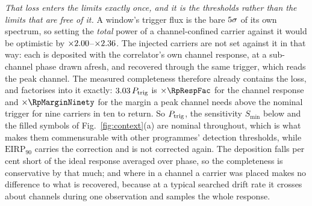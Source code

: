\emph{That loss enters the limits exactly once, and it is the thresholds
rather than the limits that are free of it.} A window's trigger flux is the
bare $5\sigma$ of its own spectrum, so setting the \emph{total}
power of a channel-confined carrier against it would be optimistic by
$\times2.00$--$\times2.36$. The injected carriers are not set
against it in that way: each is deposited with the correlator's own channel
response, at a sub-channel phase drawn afresh, and recovered through the same
trigger, which reads the peak channel. The measured completeness therefore
already contains the loss, and factorises into it exactly:
$3.03\,P_{\rm trig}$ is $\times\RpRespFac$ for the channel
response and $\times\RpMarginNinety$ for the margin a peak channel needs
above the nominal trigger for nine carriers in ten to return. So
$P_{\rm trig}$, the sensitivity $S_{\min}$ below and the filled symbols of
Fig.~\ref{fig:context}(a) are nominal throughout, which is what makes them
commensurable with other programmes' detection thresholds, while
$\mathrm{EIRP}_{90}$ carries the correction and is not corrected again.
The deposition falls \InjShortPct{} per cent short of the ideal response
averaged over phase, so the completeness is conservative by that much; and
where in a channel a carrier was placed makes no difference to what is
recovered, because at a typical searched drift rate it crosses about
\InjDriftChan{} channels during one observation and samples the whole
response.

